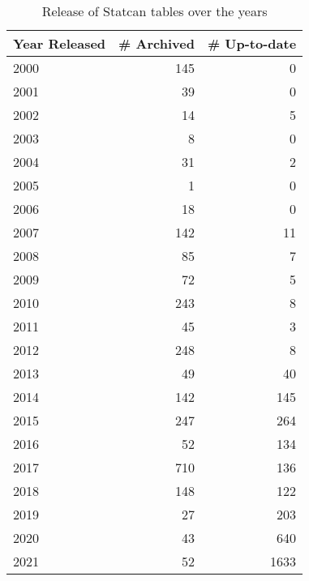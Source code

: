 \documentclass[11pt]{article}
\begin{document}
\begin{table}[h]
    \small
    \centering
\begin{tabular}{lrr}
\toprule
Year Released & \# Archived &  \# Up-to-date \\
\midrule
2000 &       145 &        0 \\
2001 &        39 &        0 \\
2002 &        14 &        5 \\
2003 &         8 &        0 \\
2004 &        31 &        2 \\
2005 &         1 &        0 \\
2006 &        18 &        0 \\
2007 &       142 &       11 \\
2008 &        85 &        7 \\
2009 &        72 &        5 \\
2010 &       243 &        8 \\
2011 &        45 &        3 \\
2012 &       248 &        8 \\
2013 &        49 &       40 \\
2014 &       142 &      145 \\
2015 &       247 &      264 \\
2016 &        52 &      134 \\
2017 &       710 &      136 \\
2018 &       148 &      122 \\
2019 &        27 &      203 \\
2020 &        43 &      640 \\
2021 &        52 &     1633 \\
\bottomrule
\end{tabular}
    \caption{Release of Statcan tables over the years}
    \label{tab:release_statcan_table}
\end{table}
\end{document}

